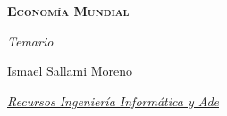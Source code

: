 \documentclass[12pt]{report} %
\begin{document}
\begin{titlepage}
    \begin{center}
        \vspace*{2cm}
        
        {\Huge \bfseries\scshape Economía Mundial \par}
        \vspace{0.5cm}
        {\Large \itshape Temario \par}
        \vspace{0.5cm}


        \vfill
        

        \begin{flushright}
            {Ismael Sallami Moreno \par}
            {\small \itshape \href{https://elblogdeismael.github.io}{Recursos Ingeniería Informática y Ade} \par}
        \end{flushright}
        \vspace{0.3cm}
        
        
    \end{center}
    
    \restoregeometry
\end{titlepage}


\thispagestyle{empty} %
\clearpage

\tableofcontents
\clearpage

%
%
\end{document}
